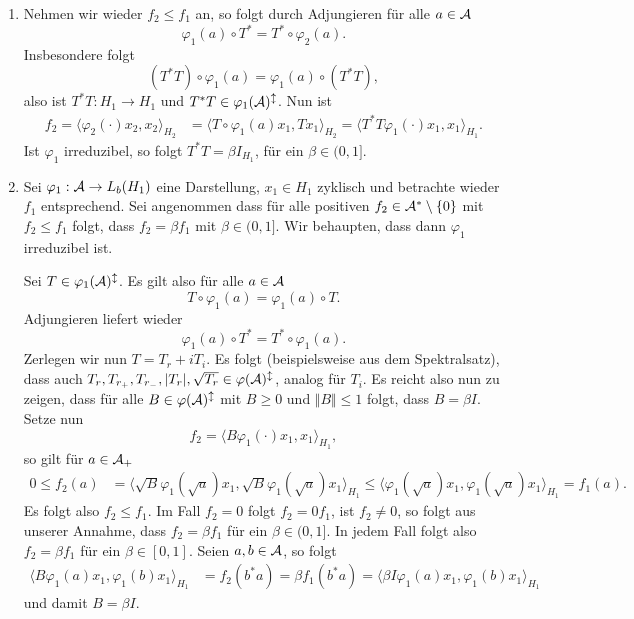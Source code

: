 \begin{remark}
\begin{enumerate}
        \item Nehmen wir wieder $f_2 \leq f_1$ an, so folgt durch Adjungieren für alle $a \in \mathcal{A}$
        \[
            \varphi_1 (a) \circ T^* = T^* \circ \varphi_2(a).
        \]
        Insbesondere folgt
        \[
            (T^* T) \circ \varphi_1(a) = \varphi_1(a) \circ (T^* T),
        \]
        also ist $T^* T : H_1 \to H_1$ und $T^* T \in \varphi_1(\mathcal{A})^\updownarrow$. Nun ist
        \begin{align*}
            f_2 = \langle \varphi_2(\cdot) x_2, x_2 \rangle_{H_2}
            &=
            \langle T \circ \varphi_1(a) x_1, T x_1 \rangle_{H_2}
            =
            \langle T^* T \varphi_1(\cdot) x_1, x_1 \rangle_{H_1}.
        \end{align*}
        Ist $\varphi_1$ irreduzibel, so folgt $T^* T = \beta I_{H_1}$, für ein $\beta \in (0, 1]$.

        \item Sei $\varphi_1 : \mathcal{A} \to L_b(H_1)$ eine Darstellung, $x_1 \in H_1$ zyklisch und betrachte wieder $f_1$ entsprechend. Sei angenommen dass für alle positiven $f_2 \in \mathcal{A}^* \setminus \{0\}$ mit $f_2 \leq f_1$ folgt, dass $f_2 = \beta f_1$ mit $\beta \in (0,1]$. Wir behaupten, dass dann $\varphi_1$ irreduzibel ist.
        
        Sei $T \in \varphi_1(\mathcal{A})^\updownarrow$. Es gilt also für alle $a \in \mathcal{A}$
        \[
            T \circ \varphi_1(a) = \varphi_1(a) \circ T.
        \]
        Adjungieren liefert wieder
        \[
            \varphi_1(a) \circ T^* = T^* \circ \varphi_1(a).
        \]
        Zerlegen wir nun $T = T_r + i T_i$. Es folgt (beispielsweise aus dem Spektralsatz), dass auch $T_r, T_{r_+}, T_{r_-}, \vert T_r \vert, \sqrt{T_r} \in \varphi(\mathcal{A})^\updownarrow$, analog für $T_i$. Es reicht also nun zu zeigen, dass für alle $B \in \varphi(\mathcal{A})^\updownarrow$ mit $B \geq 0$ und $\Vert B \Vert \leq 1$ folgt, dass $B = \beta I$. Setze nun
        \[
            f_2 = \langle B \varphi_1(\cdot) x_1, x_1 \rangle_{H_1},
        \]
        so gilt für $a \in \mathcal{A}_+$
        \begin{align*}
            0
            \leq
            f_2(a)
            &=
            \langle \sqrt{B} \varphi_1 (\sqrt{a}) x_1, \sqrt{B} \varphi_1(\sqrt{a}) x_1 \rangle_{H_1}
            \leq
            \langle \varphi_1(\sqrt{a}) x_1, \varphi_1(\sqrt{a}) x_1 \rangle_{H_1}
            =
            f_1(a).
        \end{align*}
        Es folgt also $f_2 \leq f_1$. Im Fall $f_2 = 0$ folgt $f_2 = 0 f_1$, ist $f_2 \neq 0$, so folgt aus unserer Annahme, dass $f_2 = \beta f_1$ für ein $\beta \in (0, 1]$. In jedem Fall folgt also $f_2 = \beta f_1$ für ein $\beta \in [0,1]$. Seien $a, b \in \mathcal{A}$, so folgt
        \begin{align*}
            \langle B \varphi_1(a) x_1, \varphi_1(b) x_1 \rangle_{H_1}
            &=
            f_2 (b^* a)
            =
            \beta f_1 (b^* a)
            =
            \langle \beta I \varphi_1(a) x_1, \varphi_1(b) x_1 \rangle_{H_1}
        \end{align*}
        und damit $B = \beta I$.


\end{enumerate}
\end{remark}

